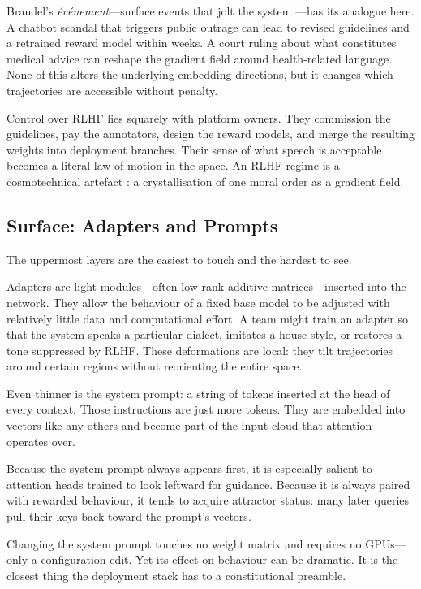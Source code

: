 \documentclass[12pt,a4paper]{article}
\begin{document}
Braudel's \emph{\'{e}v\'{e}nement}---surface events that jolt the system \cite{braudel1980}---has its analogue here. A chatbot scandal that triggers public outrage can lead to revised guidelines and a retrained reward model within weeks. A court ruling about what constitutes medical advice can reshape the gradient field around health-related language. None of this alters the underlying embedding directions, but it changes which trajectories are accessible without penalty.

Control over RLHF lies squarely with platform owners. They commission the guidelines, pay the annotators, design the reward models, and merge the resulting weights into deployment branches. Their sense of what speech is acceptable becomes a literal law of motion in the space. An RLHF regime is a cosmotechnical artefact \cite{hui2020}: a crystallisation of one moral order as a gradient field.

\subsection{Surface: Adapters and Prompts}

The uppermost layers are the easiest to touch and the hardest to see.

Adapters are light modules---often low-rank additive matrices---inserted into the network. They allow the behaviour of a fixed base model to be adjusted with relatively little data and computational effort. A team might train an adapter so that the system speaks a particular dialect, imitates a house style, or restores a tone suppressed by RLHF. These deformations are local: they tilt trajectories around certain regions without reorienting the entire space.

Even thinner is the system prompt: a string of tokens inserted at the head of every context. Those instructions are just more tokens. They are embedded into vectors like any others and become part of the input cloud that attention operates over.

Because the system prompt always appears first, it is especially salient to attention heads trained to look leftward for guidance. Because it is always paired with rewarded behaviour, it tends to acquire attractor status: many later queries pull their keys back toward the prompt's vectors.

Changing the system prompt touches no weight matrix and requires no GPUs---only a configuration edit. Yet its effect on behaviour can be dramatic. It is the closest thing the deployment stack has to a constitutional preamble.
\end{document}
